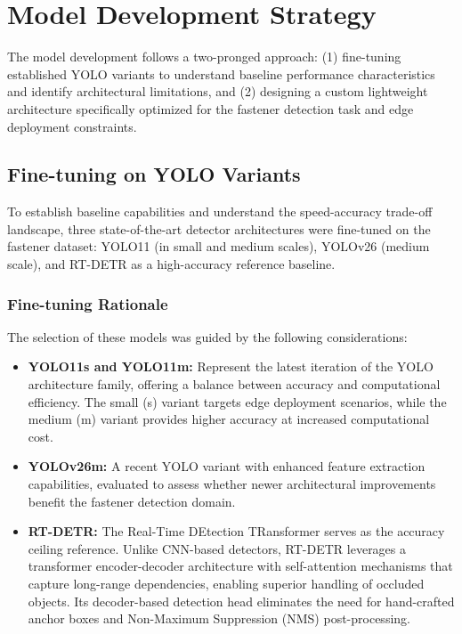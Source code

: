 \section{Model Development Strategy}
\label{sec:model_development}

The model development follows a two-pronged approach: (1) fine-tuning established YOLO variants to understand baseline performance characteristics and identify architectural limitations, and (2) designing a custom lightweight architecture specifically optimized for the fastener detection task and edge deployment constraints.

\subsection{Fine-tuning on YOLO Variants}
\label{subsec:yolo_finetuning}

To establish baseline capabilities and understand the speed-accuracy trade-off landscape, three state-of-the-art detector architectures were fine-tuned on the fastener dataset: YOLO11 (in small and medium scales), YOLOv26 (medium scale), and RT-DETR as a high-accuracy reference baseline.

\subsubsection{Fine-tuning Rationale}

The selection of these models was guided by the following considerations:

\begin{itemize}
    \item \textbf{YOLO11s and YOLO11m:} Represent the latest iteration of the YOLO architecture family, offering a balance between accuracy and computational efficiency. The small (s) variant targets edge deployment scenarios, while the medium (m) variant provides higher accuracy at increased computational cost.
    
    \item \textbf{YOLOv26m:} A recent YOLO variant with enhanced feature extraction capabilities, evaluated to assess whether newer architectural improvements benefit the fastener detection domain.
    
    \item \textbf{RT-DETR:} The Real-Time DEtection TRansformer serves as the accuracy ceiling reference. Unlike CNN-based detectors, RT-DETR leverages a transformer encoder-decoder architecture with self-attention mechanisms that capture long-range dependencies, enabling superior handling of occluded objects. Its decoder-based detection head eliminates the need for hand-crafted anchor boxes and Non-Maximum Suppression (NMS) post-processing.
\end{itemize}

